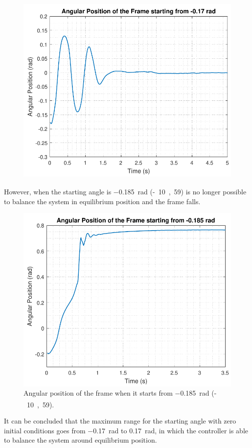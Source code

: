 \begin{minipage}{\linewidth}
\begin{minipage}{0.45\linewidth}
\begin{figure}[H]
			\includegraphics[scale=.55]{figures/testCatch_17}
			\centering
			\captionsetup{justification=centering}
			\label{testCatch_17}
		\end{figure}
	\end{minipage}
\end{minipage}

However, when the starting angle is \SI{-0,185}{rad} (\si{-10,59^\circ}) is no longer possible to balance the system in equilibrium position and the frame falls.

\begin{figure}[H] 
	\centering
	\includegraphics[scale=0.55]{figures/testCatch_185}
	\caption{Angular position of the frame when it starts from \SI{-0,185}{rad} (\si{-10,59^\circ}).}
	\label{testCatch_185}
\end{figure}\vspace{-18pt}
It can be concluded that the maximum range for the starting angle with zero initial conditions goes from \SI{-0,17}{rad} to \SI{0,17}{rad}, in which the controller is able to balance the system around equilibrium position.